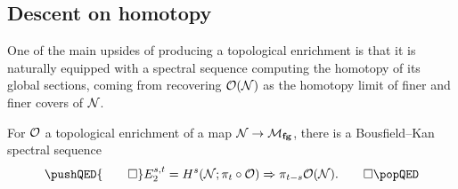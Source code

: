 \subsection*{Descent on homotopy}

One of the main upsides of producing a topological enrichment is that it is naturally equipped with a spectral sequence computing the homotopy of its global sections, coming from recovering \(\mathcal{O}(\mathcal{N})\) as the homotopy limit of finer and finer covers of \(\mathcal{N}\).

\begin{lemma}
For \(\mathcal{O}\) a topological enrichment of a map \(\mathcal{N} \to \mathcal{M}_{\mathbf{fg}}\), there is a Bousfield--Kan spectral sequence \[\pushQED{\qed} E_2^{s, t} = H^s(\stack{N}; \pi_t \circ \sheaf O) \Rightarrow \pi_{t-s} \sheaf{O}(\stack{N}). \qedhere \popQED\]
\end{lemma}

